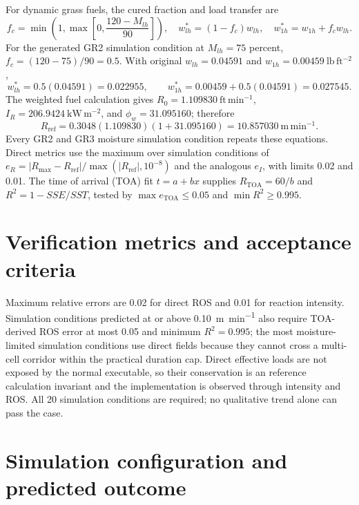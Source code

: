 For dynamic grass fuels, the cured fraction and load transfer are
\[
 f_c=\min\!\left(1,\max\!\left[0,\frac{120-M_{lh}}{90}\right]\right),
 \quad w_{lh}^{*}=(1-f_c)w_{lh},\quad
 w_{1h}^{*}=w_{1h}+f_cw_{lh}.
\]
For the generated GR2 simulation condition at \(M_{lh}=75\) percent,
\(f_c=(120-75)/90=0.5\).  With original
\(w_{lh}=0.04591\) and \(w_{1h}=0.00459~\mathrm{lb\,ft^{-2}}\),
\[
 w_{lh}^{*}=0.5(0.04591)=0.022955,\qquad
 w_{1h}^{*}=0.00459+0.5(0.04591)=0.027545.
\]
The weighted fuel calculation gives
\(R_0=1.109830~\mathrm{ft\,min^{-1}}\),
\(I_R=206.9424~\mathrm{kW\,m^{-2}}\), and
\(\phi_w=31.095160\); therefore
\[
 R_{\mathrm{ref}}=0.3048(1.109830)(1+31.095160)
 =10.857030~\mathrm{m\,min^{-1}}.
\]
Every GR2 and GR3 moisture simulation condition repeats these equations.  Direct
metrics use the maximum over simulation conditions of
\(e_R=|R_{\max}-R_{\mathrm{ref}}|/
\max(|R_{\mathrm{ref}}|,10^{-8})\) and the analogous \(e_I\), with limits
0.02 and 0.01.  The time of arrival (TOA) fit \(t=a+bx\) supplies
\(R_{\mathrm{TOA}}=60/b\) and \(R^2=1-SSE/SST\), tested by
\(\max e_{\mathrm{TOA}}\leq0.05\) and \(\min R^2\geq0.995\).

\section{Verification metrics and acceptance criteria}
Maximum relative errors are 0.02 for direct ROS and 0.01 for reaction intensity.  Simulation conditions predicted at or above \SI{0.10}{m.min^{-1}} also require TOA-derived ROS error at most 0.05 and minimum $R^2=0.995$; the most moisture-limited simulation conditions use direct fields because they cannot cross a multi-cell corridor within the practical duration cap.  Direct effective loads are not exposed by the normal executable, so their conservation is an reference calculation invariant and the implementation is observed through intensity and ROS.  All 20 simulation conditions are required; no qualitative trend alone can pass the case.

\section{Simulation configuration and predicted outcome}

